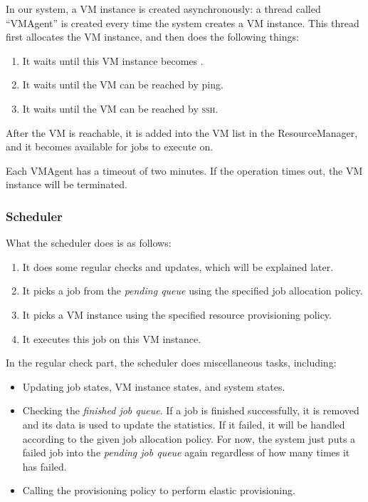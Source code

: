 In our system, a VM instance is created asynchronously: a
thread called ``VMAgent'' is created every time the system creates a
VM instance. This thread first allocates the VM instance, and then
does the following things:

\begin{enumerate}
\item It waits until this VM instance becomes \staterunning.
\item It waits until the VM can be reached by ping.
\item It waits until the VM can be reached by \textsc{ssh}.
\end{enumerate}

After the VM is reachable, it is added into the VM list in the
ResourceManager, and it becomes available for jobs to execute on.

Each VMAgent has a timeout of two minutes. If the operation times out,
the VM instance will be terminated.

\subsubsection{Scheduler}
What the scheduler does is as follows:

\begin{enumerate}
\item It does some regular checks and updates, which will be explained
  later.
\item It picks a job from the \emph{pending queue} using the specified
  job allocation policy.
\item It picks a VM instance using the specified resource provisioning
  policy.
\item It executes this job on this VM instance.
\end{enumerate}

In the regular check part, the scheduler does miscellaneous tasks,
including:
\begin{itemize}
\item Updating job states, VM instance states, and system states.
\item Checking the \emph{finished job queue}. If a job is finished
  successfully, it is removed and its data is used to update the
  statistics. If it failed, it will be handled according to the given
  job allocation policy. For now, the system just puts a failed job into
  the \emph{pending job queue} again regardless of how many times it
  has failed.
\item Calling the provisioning policy to perform elastic provisioning.
\end{itemize}

